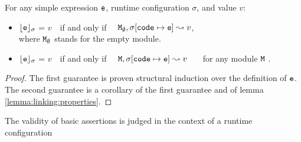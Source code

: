 \begin{lemma}
For any simple expression ${\mbox{\tt{e}}}$, runtime configuration $\sigma$, and value $v$:

\begin{itemize}
     \item 
  ${\lfloor{ {\ensuremath{{\mbox{\tt{e}}}}}}\rfloor_{\sigma}}$ = $v$\ \     if and only if \ \ ${\mbox{\tt{\ensuremath{{\mbox{\tt{M}}}}}}}_\emptyset, \sigma[{\mbox{\tt{code}}}\mapsto {\mbox{\tt{e}}}] \leadsto v$,\\
  where ${\mbox{\tt{\ensuremath{{\mbox{\tt{M}}}}}}}_\emptyset$ stands for the empty module.
  \item
   ${\lfloor{ {\ensuremath{{\mbox{\tt{e}}}}}}\rfloor_{\sigma}}$ = $v$\ \     if and only if \ \ ${\mbox{\tt{\ensuremath{{\mbox{\tt{M}}}}}}}, \sigma[{\mbox{\tt{code}}}\mapsto {\mbox{\tt{e}}}] \leadsto v$ \ \ \ for any module ${\mbox{\tt{\ensuremath{{\mbox{\tt{M}}}}}}}$ .
   \end{itemize}
   \end{lemma}
   
   \begin{proof} The  first guarantee is proven structural induction  over the definition of ${\mbox{\tt{e}}}$.
   The second guarantee  is a corollary of the first guarantee  and of lemma \ref{lemma:linking:properties}.\end{proof}


The validity of basic assertions is judged in the context of a runtime configuration

